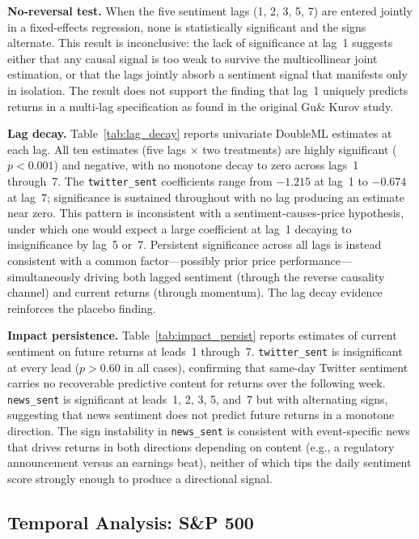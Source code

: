 \textbf{No-reversal test.} When the five sentiment lags (1, 2, 3, 5, 7)
are entered jointly in a fixed-effects regression, none is statistically
significant and the signs alternate. This result is inconclusive: the
lack of significance at lag~1 suggests either that any causal signal is
too weak to survive the multicollinear joint estimation, or that the
lags jointly absorb a sentiment signal that manifests only in isolation.
The result does not support the finding that lag~1 uniquely predicts
returns in a multi-lag specification as found in the original Gu\& Kurov
study.

\textbf{Lag decay.}
Table~\ref{tab:lag_decay} reports
univariate DoubleML estimates at each lag. All ten estimates (five lags
\(\times\) two treatments) are highly significant (\(p < 0.001\)) and
negative, with no monotone decay to zero across lags~1 through~7. The
\texttt{twitter\_sent} coefficients range from \(-1.215\) at lag~1 to
\(-0.674\) at lag~7; significance is sustained throughout with no lag
producing an estimate near zero. This pattern is inconsistent with a
sentiment-causes-price hypothesis, under which one would expect a large
coefficient at lag~1 decaying to insignificance by lag~5 or~7. Persistent
significance across all lags is instead consistent with a common
factor---possibly prior price performance---simultaneously driving both
lagged sentiment (through the reverse causality channel) and current
returns (through momentum). The
lag decay evidence reinforces the placebo finding.

\textbf{Impact persistence.}
Table~\ref{tab:impact_persist}
reports estimates of current sentiment on future returns at leads~1
through~7. \texttt{twitter\_sent} is insignificant at every lead
(\(p > 0.60\) in all cases), confirming that same-day Twitter sentiment
carries no recoverable predictive content for returns over the following
week. \texttt{news\_sent} is significant at leads~1, 2, 3, 5, and~7 but
with alternating signs, suggesting that news sentiment does not predict
future returns in a monotone direction. The sign instability in
\texttt{news\_sent} is consistent with event-specific news that drives
returns in both directions depending on content (e.g., a regulatory
announcement versus an earnings beat), neither of which tips the daily
sentiment score strongly enough to produce a directional signal.

\subsection{Temporal Analysis: S\&P
500}\label{temporal-analysis-sp-500}


